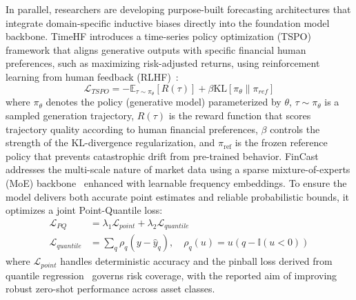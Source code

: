 \documentclass[11pt,a4paper]{article}
\begin{document}
In parallel, researchers are developing purpose-built forecasting architectures that integrate domain-specific inductive biases directly into the foundation model backbone. TimeHF \citep{qi2025timehf} introduces a time-series policy optimization (TSPO) framework that aligns generative outputs with specific financial human preferences, such as maximizing risk-adjusted returns, using reinforcement learning from human feedback (RLHF)~\citep{christiano2017deep,ouyang2022training}:
\begin{equation}
\mathcal{L}_{TSPO} = -\mathbb{E}_{\tau \sim \pi_\theta}[R(\tau)] + \beta \text{KL}[\pi_\theta \| \pi_{ref}]
\end{equation}
where $\pi_\theta$ denotes the policy (generative model) parameterized by $\theta$, $\tau \sim \pi_\theta$ is a sampled generation trajectory, $R(\tau)$ is the reward function that scores trajectory quality according to human financial preferences, $\beta$ controls the strength of the KL-divergence regularization, and $\pi_{\text{ref}}$ is the frozen reference policy that prevents catastrophic drift from pre-trained behavior.
FinCast \citep{zhu2025fincast} addresses the multi-scale nature of market data using a sparse mixture-of-experts (MoE) backbone~\citep{shazeer2017outrageously,fedus2022switch} enhanced with learnable frequency embeddings. To ensure the model delivers both accurate point estimates and reliable probabilistic bounds, it optimizes a joint Point-Quantile loss:
\begin{align}
\mathcal{L}_{PQ} &= \lambda_1 \mathcal{L}_{point} + \lambda_2 \mathcal{L}_{quantile} \\
\mathcal{L}_{quantile} &= \sum_q \rho_q(y - \hat{y}_q), \quad \rho_q(u) = u(q - \mathbb{I}(u < 0))
\end{align}
where $\mathcal{L}_{point}$ handles deterministic accuracy and the pinball loss derived from quantile regression~\citep{koenker1978regression} governs risk coverage, with the reported aim of improving robust zero-shot performance across asset classes.
\end{document}
